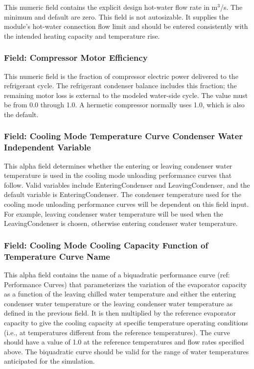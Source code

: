 This numeric field contains the explicit design hot-water flow rate in m\(^{3}\)/s. The minimum and default are zero. This field is not autosizable. It supplies the module's hot-water connection flow limit and should be entered consistently with the intended heating capacity and temperature rise.

\subsubsection{Field: Compressor Motor Efficiency}\label{field-compressor-motor-efficiency}

This numeric field is the fraction of compressor electric power delivered to the refrigerant cycle. The refrigerant condenser balance includes this fraction; the remaining motor loss is external to the modeled water-side cycle. The value must be from 0.0 through 1.0. A hermetic compressor normally uses 1.0, which is also the default.

\subsubsection{Field: Cooling Mode Temperature Curve Condenser Water Independent Variable}\label{field-cooling-mode-temperature-curve-condenser-water-independent-variable}

This alpha field determines whether the entering or leaving condenser water temperature is used in the cooling mode unloading performance curves that follow. Valid variables include EnteringCondenser and LeavingCondenser, and the default variable is EnteringCondenser. The condenser temperature used for the cooling mode unloading performance curves will be dependent on this field input. For example, leaving condenser water temperature will be used when the LeavingCondenser is chosen, otherwise entering condenser water temperature.

\subsubsection{Field: Cooling Mode Cooling Capacity Function of Temperature Curve Name}\label{field-cooling-mode-cooling-capacity-function-of-temperature-curve-name}

This alpha field contains the name of a biquadratic performance curve (ref: Performance Curves) that parameterizes the variation of the evaporator capacity as a function of the leaving chilled water temperature and either the entering condenser water temperature or the leaving condenser water temperature as defined in the previous field. It is then multiplied by the reference evaporator capacity to give the cooling capacity at specific temperature operating conditions (i.e., at temperatures different from the reference temperatures). The curve should have a value of 1.0 at the reference temperatures and flow rates specified above. The biquadratic curve should be valid for the range of water temperatures anticipated for the simulation.

